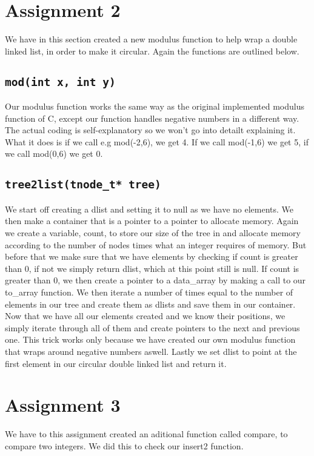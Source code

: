\documentclass[11pt,a4paper]{article}
\begin{document}
\section{Assignment 2}
We have in this section created a new modulus function to help wrap a double
linked list, in order to make it circular. Again the functions are outlined
below.

\subsection{\texttt{mod(int x, int y)}}
Our modulus function works the same way as the original implemented modulus
function of C, except our function handles negative numbers in a different way.
The actual coding is self-explanatory so we won't go into detailt explaining
it. What it does is if we call e.g mod(-2,6), we get 4. If we call mod(-1,6) we
get 5, if we call mod(0,6) we get 0. 

\subsection{\texttt{tree2list(tnode\_t* tree)}}
We start off creating a dlist and setting it to null as we have no elements. We
then make a container that is a pointer to a pointer to allocate memory. Again
we create a variable, count, to store our size of the tree in and allocate
memory according to the number of nodes times what an integer requires of
memory. But before that we make sure that we have elements by checking if count
is greater than 0, if not we simply return dlist, which at this point still is
null. If count is greater than 0, we then create a pointer to a data\_array by
making a call to our to\_array function. We then iterate a number of times
equal to the number of elements in our tree and create them as dlists and save
them in our container. Now that we have all our elements created and we know
their positions, we simply iterate through all of them and create pointers to
the next and previous one. This trick works only because we have created our
own modulus function that wraps around negative numbers aswell. Lastly we set
dlist to point at the first element in our circular double linked list and
return it.

\section{Assignment 3}
We have to this assignment created an aditional function called compare, to
compare two integers. We did this to check our insert2 function.
\end{document}
